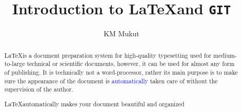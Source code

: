 \documentclass[a4paper, 12pt, one column]{article}
\title{Introduction to \LaTeX \space and \texttt{GIT}}
\author{KM Mukut}
\begin{document}
\maketitle

\begin{abstract}

    \LaTeX is a document preparation system for high-quality typesetting used for medium-to-large technical or scientific documents, however,  it can be used for almost any form of publishing. It is technically not a word-processor, rather its main purpose is to make sure the appearance of the document is \textcolor{blue}{automatically} taken care of without the supervision of the author. 
    
    \vspace{0.3cm}

     {
            {
            \begin{minipage}{0.8\textwidth}
                \centering
               \LaTeX \space automatically makes your document beautiful and organized 
            \end{minipage}
            }
        }

\end{abstract}
\end{document}
